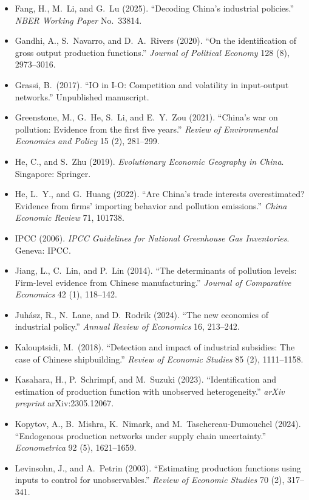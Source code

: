 \documentclass[11pt,a4paper]{article}
\begin{document}
\begin{itemize}
\item Fang, H., M.\ Li, and G.\ Lu (2025). ``Decoding China's industrial policies.'' \textit{NBER Working Paper} No.\ 33814.\item Gandhi, A., S.\ Navarro, and D.\ A.\ Rivers (2020). ``On the identification of gross output production functions.'' \textit{Journal of Political Economy} 128 (8), 2973--3016.\item Grassi, B.\ (2017). ``IO in I-O: Competition and volatility in input-output networks.'' Unpublished manuscript.
\item Greenstone, M., G.\ He, S.\ Li, and E.\ Y.\ Zou (2021). ``China's war on pollution: Evidence from the first five years.'' \textit{Review of Environmental Economics and Policy} 15 (2), 281--299.
\item He, C., and S.\ Zhu (2019). \textit{Evolutionary Economic Geography in China}. Singapore: Springer.
\item He, L.\ Y., and G.\ Huang (2022). ``Are China's trade interests overestimated? Evidence from firms' importing behavior and pollution emissions.'' \textit{China Economic Review} 71, 101738.
\item IPCC (2006). \textit{IPCC Guidelines for National Greenhouse Gas Inventories}. Geneva: IPCC.
\item Jiang, L., C.\ Lin, and P.\ Lin (2014). ``The determinants of pollution levels: Firm-level evidence from Chinese manufacturing.'' \textit{Journal of Comparative Economics} 42 (1), 118--142.
\item Juh\'asz, R., N.\ Lane, and D.\ Rodrik (2024). ``The new economics of industrial policy.'' \textit{Annual Review of Economics} 16, 213--242.
\item Kalouptsidi, M.\ (2018). ``Detection and impact of industrial subsidies: The case of Chinese shipbuilding.'' \textit{Review of Economic Studies} 85 (2), 1111--1158.
\item Kasahara, H., P.\ Schrimpf, and M.\ Suzuki (2023). ``Identification and estimation of production function with unobserved heterogeneity.'' \textit{arXiv preprint} arXiv:2305.12067.\item Kopytov, A., B.\ Mishra, K.\ Nimark, and M.\ Taschereau-Dumouchel (2024). ``Endogenous production networks under supply chain uncertainty.'' \textit{Econometrica} 92 (5), 1621--1659.
\item Levinsohn, J., and A.\ Petrin (2003). ``Estimating production functions using inputs to control for unobservables.'' \textit{Review of Economic Studies} 70 (2), 317--341.

\end{itemize}
\end{document}
